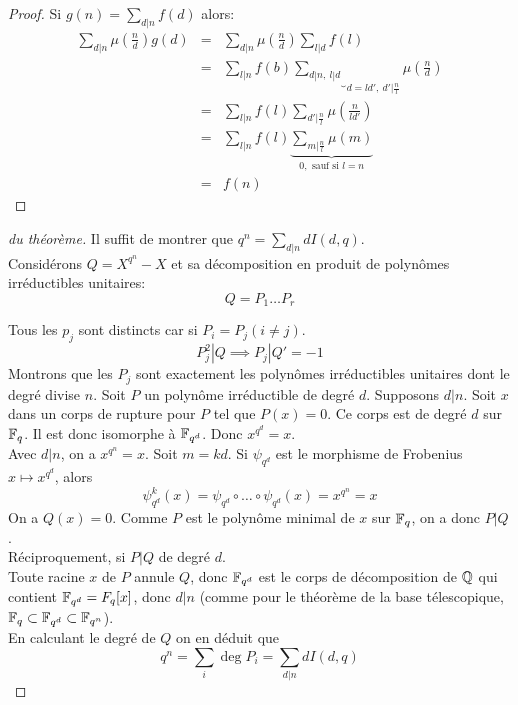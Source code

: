 \begin{proof}
	Si $g(n) = \sum_{d|n} f(d)$ alors:
	\begin{eqnarray*}
		\sum_{d|n} \mu(\frac n d) g(d) &=& \sum_{d|n} \mu(\frac n d) \sum_{l|d} f(l) \\
		&=& \sum_{l|n} f(b) \underbrace{\sum_{d|n,\ l|d}}_{ d = ld', \ d' | \frac n l} \mu(\frac n d) \\
		&=& \sum_{l | n} f(l) \sum_{d' | \frac n l} \mu(\frac n {ld'}) \\
		&=& \sum_{l | n} f(l) \underbrace{\sum_{m | \frac n l} \mu(m)}_{ 0, \text{ sauf si } l = n } \\
		&=& f(n)
	\end{eqnarray*}
\end{proof}

\begin{proof}[du théorème]
	Il suffit de montrer que $q^n = \sum_{d|n} d I(d,q)$.\\

	Considérons $Q = X^{q^n} - X$ et sa décomposition en produit de polynômes irréductibles unitaires:
	$$ Q = P_1 \ldots P_r$$

	Tous les $p_j$ sont distincts car si $P_i = P_j (i \neq j)$.\\
	$$P_j^2 | Q \implies P_j | Q' = - 1$$
	Montrons que les $P_j$ sont exactement les polynômes irréductibles unitaires dont le degré divise $n$. Soit $P$ un
	polynôme irréductible de degré $d$. Supposons $d | n$. Soit $x$ dans un corps de rupture pour $P$ tel que $P(x) = 0$.
	Ce corps est de degré $d$ sur $\mathbb{F}_q$. Il est donc isomorphe à $\mathbb{F}_{q^d}$. Donc $x^{q^d} = x$.\\
	Avec $d|n$, on a $x^{q^n} = x$. Soit $m = kd$. Si $\psi_{q^d}$ est le morphisme de Frobenius $x \mapsto x^{q^d}$, alors
	$$\psi_{q^d}^k(x) = \psi_{q^d} \circ \dots \circ \psi_{q^d}(x) = x^{q^n} = x$$
	On a $Q(x) = 0$. Comme $P$ est le polynôme minimal de $x$ sur $\mathbb{F}_q$, on a donc $P | Q$.\\

	Réciproquement, si $P | Q$ de degré $d$.\\
	Toute racine $x$ de $P$ annule $Q$, donc $\mathbb{F}_{q^d}$ est le corps de décomposition de $\mathbb{Q}$ qui contient $\mathbb{F}_{q^d} = F_q[x]$, donc
	$d | n$ (comme pour le théorème de la base télescopique, $\mathbb{F}_q \subset \mathbb{F}_{q^d} \subset \mathbb{F}_{q^n}$).\\

	En calculant le degré de $Q$ on en déduit que
	$$q^n = \sum_i \deg P_i = \sum_{d|n} d I(d,q)$$
\end{proof}


